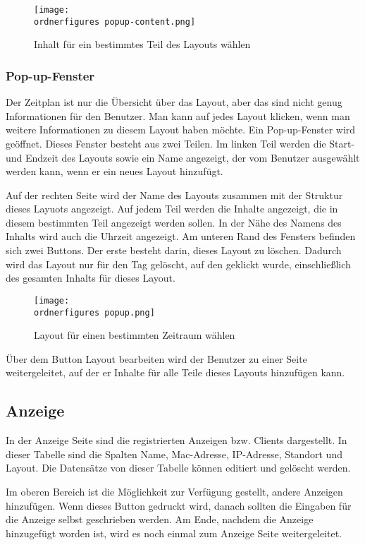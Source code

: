 \begin{figure}[H]
	\centering
	\texttt{[image: \\ordnerfigures popup-content.png]}
	\caption{Inhalt für ein bestimmtes Teil des Layouts wählen}
	\label{fi:popup-content}
\end{figure}


\subsubsection{Pop-up-Fenster}

Der Zeitplan ist nur die Übersicht über das Layout, aber das sind nicht genug Informationen für den Benutzer. Man kann auf jedes Layout klicken, wenn man weitere Informationen zu diesem Layout haben möchte. Ein Pop-up-Fenster wird geöffnet. Dieses Fenster besteht aus zwei Teilen. Im linken Teil werden die Start- und Endzeit des Layouts sowie ein Name angezeigt, der vom Benutzer ausgewählt werden kann, wenn er ein neues Layout hinzufügt.

Auf der rechten Seite wird der Name des Layouts zusammen mit der Struktur dieses Layuots angezeigt.
Auf jedem Teil werden die Inhalte angezeigt, die in diesem bestimmten Teil angezeigt werden sollen. In der Nähe des Namens des Inhalts wird auch die Uhrzeit angezeigt.
Am unteren Rand des Fensters befinden sich zwei Buttons. Der erste besteht darin, dieses Layout zu löschen. Dadurch wird das Layout nur für den Tag gelöscht, auf den geklickt wurde, einschließlich des gesamten Inhalts für dieses Layout.

\begin{figure}[ht]
	\centering
	\texttt{[image: \\ordnerfigures popup.png]}
	\caption{Layout  für einen bestimmten Zeitraum wählen}
	\label{fi:popup}
\end{figure}

Über dem Button Layout bearbeiten wird der Benutzer zu einer Seite weitergeleitet, auf der er Inhalte für alle Teile dieses Layouts hinzufügen kann.


\subsection{Anzeige}

In der Anzeige Seite sind die registrierten Anzeigen bzw. Clients dargestellt. In dieser Tabelle sind die Spalten Name, Mac-Adresse, IP-Adresse, Standort und Layout. Die Datensätze von dieser Tabelle können editiert und gelöscht werden. 

Im oberen Bereich ist die Möglichkeit zur Verfügung gestellt, andere Anzeigen hinzufügen.
Wenn dieses Button gedruckt wird, danach sollten die Eingaben für die Anzeige selbst geschrieben werden. Am Ende, nachdem die Anzeige hinzugefügt worden ist, wird es noch einmal zum Anzeige Seite weitergeleitet.

